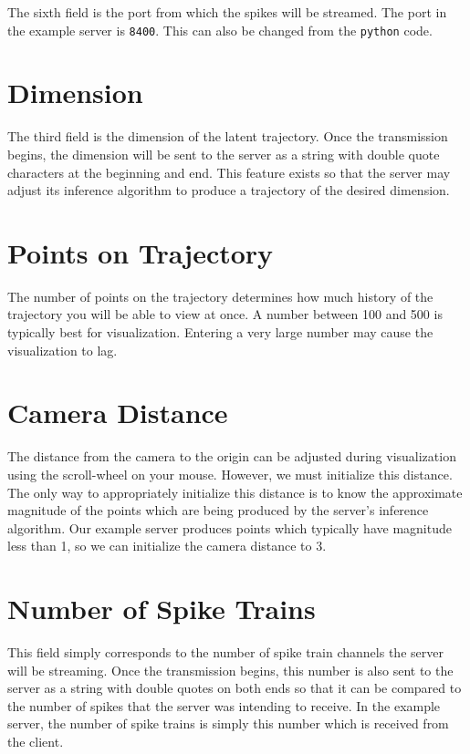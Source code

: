 \documentclass[12pt, openany]{book}
\begin{document}
The sixth field is the port from which the spikes will be streamed. The port in the example server is \texttt{8400}. This can also be changed from the \texttt{python} code.

\section{Dimension}

The third field is the dimension of the latent trajectory. Once the transmission begins, the dimension will be sent to the server as a string with double quote characters at the beginning and end. This feature exists so that the server may adjust its inference algorithm to produce a trajectory of the desired dimension.

\section{Points on Trajectory}

The number of points on the trajectory determines how much history of the trajectory you will be able to view at once. A number between 100 and 500 is typically best for visualization. Entering a very large number may cause the visualization to lag.

\section{Camera Distance}

The distance from the camera to the origin can be adjusted during visualization using the scroll-wheel on your mouse. However, we must initialize this distance. The only way to appropriately initialize this distance is to know the approximate magnitude of the points which are being produced by the server's inference algorithm. Our example server produces points which typically have magnitude less than 1, so we can initialize the camera distance to 3.

\section{Number of Spike Trains}

This field simply corresponds to the number of spike train channels the server will be streaming. Once the transmission begins, this number is also sent to the server as a string with double quotes on both ends so that it can be compared to the number of spikes that the server was intending to receive. In the example server, the number of spike trains is simply this number which is received from the client.
\end{document}
